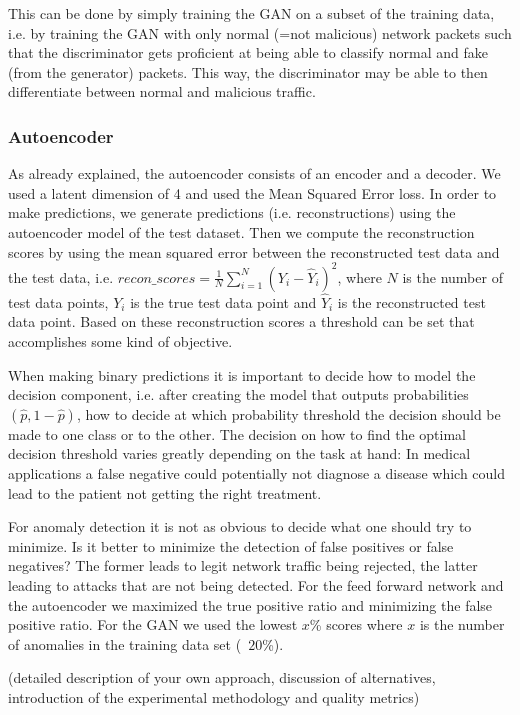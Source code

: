 \documentclass[]{article}
\begin{document}
	 This can be done by simply training the GAN on a subset of the training data, i.e. by training the GAN with only normal (=not malicious) network packets such that the discriminator gets proficient at being able to classify normal and fake (from the generator) packets. This way, the discriminator may be able to then differentiate between normal and malicious traffic. 
	 
     \subsubsection{Autoencoder}
     As already explained, the autoencoder consists of an encoder and a decoder. We used a latent dimension of 4 and used the Mean Squared Error loss. In order to make predictions, we generate predictions (i.e. reconstructions) using the autoencoder model of the test dataset. Then we compute the reconstruction scores by using the mean squared error between the reconstructed test data and the test data, i.e. $recon\_scores = \frac{1}{N} \sum_{i=1}^{N} (Y_i - \hat{Y}_i)^2$, where $N$ is the number of test data points, $Y_i$ is the true test data point and $\hat{Y}_i$ is the reconstructed test data point. Based on these reconstruction scores a threshold can be set that accomplishes some kind of objective.
     

     When making binary predictions it is important to decide how to model the decision component, i.e. after creating the model that outputs probabilities $(\hat{p}, 1-\hat{p})$, how to decide at which probability threshold the decision should be made to one class or to the other. The decision on how to find the optimal decision threshold varies greatly depending on the task at hand: In medical applications a false negative could potentially not diagnose a disease which could lead to the patient not getting the right treatment.
     
     For anomaly detection it is not as obvious to decide what one should try to minimize. Is it better to minimize the detection of false positives or false negatives? The former leads to legit network traffic being rejected, the latter leading to attacks that are not being detected. For the feed forward network and the autoencoder we maximized the true positive ratio and minimizing the false positive ratio. For the GAN we used the lowest $x$\% scores where $x$ is the number of anomalies in the training data set (~$20$\%).
     
     
	(detailed description of your own approach, discussion of alternatives, introduction of the experimental methodology and quality metrics)
	
\end{document}
